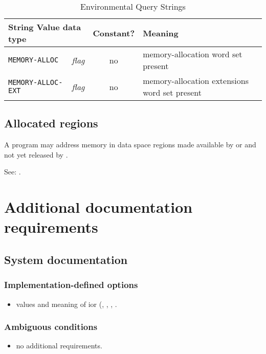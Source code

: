 \begin{table}[ht]
  \begin{center}
	\caption{Environmental Query Strings}
	\label{mem:env}
	\begin{tabular}{p{9em}rcp{}}
		\hline\hline
		\multicolumn{2}{l}{String \hfill Value data type} & Constant? & Meaning \\
		\hline
		\texttt{MEMORY-ALLOC}		& \emph{flag}		& no	&
			memory-allocation word set present \\
		\texttt{MEMORY-ALLOC-EXT}	& \emph{flag}		& no	&
			memory-allocation extensions word set present \\
		\hline\hline
	\end{tabular}
  \end{center}
\end{table}

\subsection{Allocated regions} %

A program may address memory in data space regions made available
by  or  and not yet released by .

See: .


\section{Additional documentation requirements} %

\subsection{System documentation} %

\subsubsection{Implementation-defined options} %
\begin{itemize}
\item values and meaning of ior
	(,
	 ,
	 ,
	 .
\end{itemize}

\subsubsection{Ambiguous conditions} %
\begin{itemize}
\item no additional requirements.
\end{itemize}

